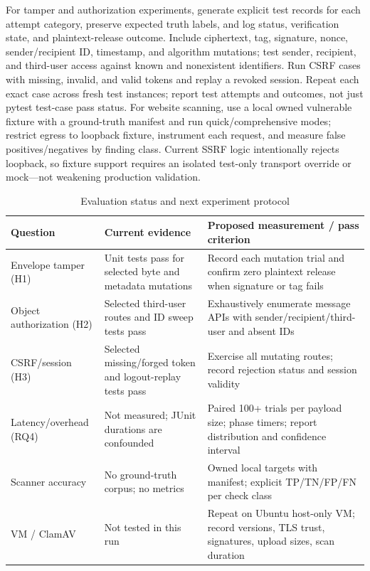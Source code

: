 \documentclass[conference]{IEEEtran}
\begin{document}
For tamper and authorization experiments, generate explicit test records for each attempt category, preserve expected truth labels, and log status, verification state, and plaintext-release outcome. Include ciphertext, tag, signature, nonce, sender/recipient ID, timestamp, and algorithm mutations; test sender, recipient, and third-user access against known and nonexistent identifiers. Run CSRF cases with missing, invalid, and valid tokens and replay a revoked session. Repeat each exact case across fresh test instances; report test attempts and outcomes, not just pytest test-case pass status. For website scanning, use a local owned vulnerable fixture with a ground-truth manifest and run quick/comprehensive modes; restrict egress to loopback fixture, instrument each request, and measure false positives/negatives by finding class. Current SSRF logic intentionally rejects loopback, so fixture support requires an isolated test-only transport override or mock—not weakening production validation.

\begin{table}[t]
\caption{Evaluation status and next experiment protocol}
\label{tab:experiments}
\centering
\footnotesize
\begin{tabular}{p{}p{}p{}}
\toprule
Question & Current evidence & Proposed measurement / pass criterion\\
\midrule
Envelope tamper (H1) & Unit tests pass for selected byte and metadata mutations & Record each mutation trial and confirm zero plaintext release when signature or tag fails\\
Object authorization (H2) & Selected third-user routes and ID sweep tests pass & Exhaustively enumerate message APIs with sender/recipient/third-user and absent IDs\\
CSRF/session (H3) & Selected missing/forged token and logout-replay tests pass & Exercise all mutating routes; record rejection status and session validity\\
Latency/overhead (RQ4) & Not measured; JUnit durations are confounded & Paired 100+ trials per payload size; phase timers; report distribution and confidence interval\\
Scanner accuracy & No ground-truth corpus; no metrics & Owned local targets with manifest; explicit TP/TN/FP/FN per check class\\
VM / ClamAV & Not tested in this run & Repeat on Ubuntu host-only VM; record versions, TLS trust, signatures, upload sizes, scan duration\\
\bottomrule
\end{tabular}
\end{table}
\end{document}
